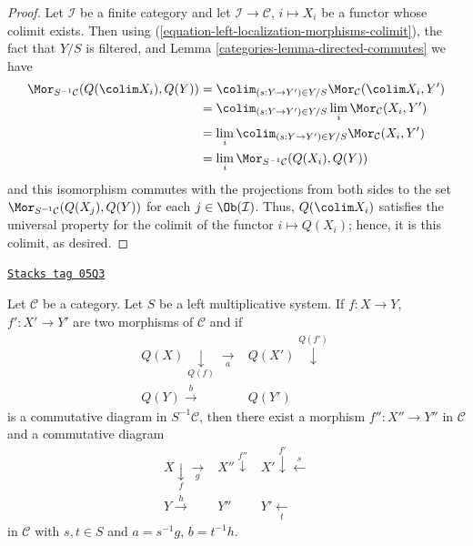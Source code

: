 \begin{proof}

Let $\mathcal{I}$ be a finite category and let
$\mathcal{I} \to \mathcal{C}$, $i \mapsto X_i$
be a functor whose colimit exists. Then using
(\ref{equation-left-localization-morphisms-colimit}),
the fact that $Y/S$ is filtered, and
Lemma \ref{categories-lemma-directed-commutes} we have
\begin{align*}
\Mor_{S^{-1}\mathcal{C}}(Q(\colim X_i), Q(Y))
& =
\colim_{(s : Y \to Y') \in Y/S} \Mor_\mathcal{C}(\colim X_i, Y') \\
& =
\colim_{(s : Y \to Y') \in Y/S} \lim_i \Mor_\mathcal{C}(X_i, Y') \\
& =
\lim_i \colim_{(s : Y \to Y') \in Y/S} \Mor_\mathcal{C}(X_i, Y') \\
& =
\lim_i \Mor_{S^{-1}\mathcal{C}}(Q(X_i), Q(Y))
\end{align*}
and this isomorphism commutes with the projections
from both sides to the set
$\Mor_{S^{-1}\mathcal{C}}(Q(X_j), Q(Y))$ for each
$j \in \Ob(\mathcal{I})$. Thus, $Q(\colim X_i)$ satisfies
the universal property for the colimit of the functor
$i \mapsto Q(X_i)$; hence, it is this colimit, as desired.
\end{proof}

\begin{lemma}
\label{categories-lemma-left-localization-diagram}
\href{https://stacks.math.columbia.edu/tag/05Q3}{\texttt{Stacks tag 05Q3}}

Let $\mathcal{C}$ be a category. Let $S$ be a left multiplicative
system. If $f : X \to Y$, $f' : X' \to Y'$ are two morphisms of
$\mathcal{C}$ and if
$$
\begin{array}{cc}Q(X) \underset{Q(f)}{\downarrow}\underset{a}{\longrightarrow} & Q(X') \overset{Q(f')}{\downarrow} \\ Q(Y) \overset{b}{\longrightarrow} & Q(Y')\end{array}
$$
is a commutative diagram in $S^{-1}\mathcal{C}$, then there exist
a morphism $f'' : X'' \to Y''$ in $\mathcal{C}$ and a commutative
diagram
$$
\begin{array}{ccc}X \underset{f}{\downarrow}\underset{g}{\longrightarrow} & X'' \overset{f''}{\downarrow} & X' \overset{f'}{\downarrow}\overset{s}{\longleftarrow} \\ Y \overset{h}{\longrightarrow} & Y'' & Y' \underset{t}{\longleftarrow}\end{array}
$$
in $\mathcal{C}$ with $s, t \in S$ and $a = s^{-1}g$, $b = t^{-1}h$.
\end{lemma}

